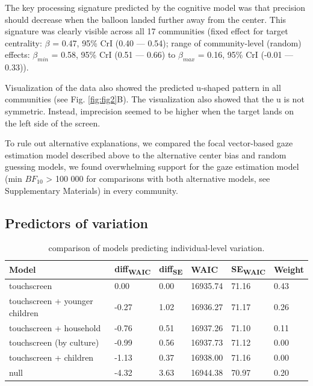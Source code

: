 \documentclass[
  man,floatsintext]{apa7}
\begin{document}
The key processing signature predicted by the cognitive model was that precision should decrease when the balloon landed further away from the center. This signature was clearly visible across all 17 communities (fixed effect for target centrality: \(\beta\) = 0.47, 95\% CrI (0.40 --- 0.54); range of community-level (random) effects: \(\beta_{min}\) = 0.58, 95\% CrI (0.51 --- 0.66) to \(\beta_{max}\) = 0.16, 95\% CrI (-0.01 --- 0.33)).

Visualization of the data also showed the predicted u-shaped pattern in all communities (see Fig. \ref{fig:fig2}B). The visualization also showed that the u is not symmetric. Instead, imprecision seemed to be higher when the target lands on the left side of the screen.

To rule out alternative explanations, we compared the focal vector-based gaze estimation model described above to the alternative center bias and random guessing models, we found overwhelming support for the gaze estimation model (min \(BF_{10}\) \textgreater{} 100 000 for comparisons with both alternative models, see Supplementary Materials) in every community.

\hypertarget{predictors-of-variation-1}{%
\subsection{Predictors of variation}\label{predictors-of-variation-1}}

\begin{table}

\caption{\label{tab:predcomptable}comparison of models predicting individual-level variation.}
\centering
\begin{tabular}[t]{llllll}
\toprule
Model & diff\textsubscript{WAIC} & diff\textsubscript{SE} & WAIC & SE\textsubscript{WAIC} & Weight\\
\midrule
touchscreen & 0.00 & 0.00 & 16935.74 & 71.16 & 0.43\\
touchscreen + younger children & -0.27 & 1.02 & 16936.27 & 71.17 & 0.26\\
touchscreen + household & -0.76 & 0.51 & 16937.26 & 71.10 & 0.11\\
touchscreen (by culture) & -0.99 & 0.56 & 16937.73 & 71.12 & 0.00\\
touchscreen + children & -1.13 & 0.37 & 16938.00 & 71.16 & 0.00\\
\addlinespace
null & -4.32 & 3.63 & 16944.38 & 70.97 & 0.20\\
\bottomrule
\end{tabular}
\end{table}
\end{document}
